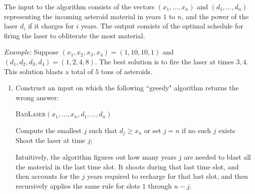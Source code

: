 \documentclass[11pt]{article}
\theoremstyle{definition}
\begin{document}
\begin{enumerate}[leftmargin=0pt, itemsep=3ex]
The input to the algorithm consists of the vectors $(x_1,\ldots,x_n)$ and $(d_1,\ldots,d_n)$ representing the incoming asteroid material in years $1$ to $n$, and the power of the laser $d_i$ if it charges for $i$ years.  The output consists of the optimal schedule for firing the laser to obliterate the most material.

\medskip
\emph{Example:} Suppose $(x_1,x_2,x_3,x_4)=(1,10,10,1)$ and $(d_1,d_2,d_3,d_4) = (1,2,4,8)$.  
The best solution is to fire the laser at times $3,4$.  This solution blasts a total of $5$ tons of asteroids.

    \begin{enumerate}[leftmargin=0pt, itemsep=3ex]
    \item Construct an input on which  the following ``greedy" algorithm returns the wrong answer:
    
    \begin{algorithm}[h!]
    \DontPrintSemicolon
    \caption{\textsc{BadLaser}$(x_1,\ldots,x_n,d_1,\ldots,d_n)$}
    Compute the smallest $j$ such that $d_j\geq x_n$ or set $j = n$ if no such $j$ exists \;
    Shoot the laser at time $j$;
    
    \end{algorithm}
    Intuitively, the algorithm figures out how many years $j$ are needed to blast all the material in the last time slot.  It shoots during that last time slot, and then accounts for the $j$ years required to recharge for that last slot, and then recursively applies the same rule for slots $1$ through $n-j$. 
    
    
    

\end{enumerate}
\end{enumerate}
\end{document}
